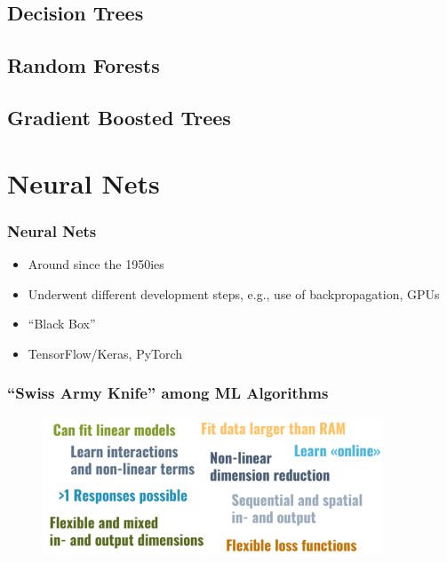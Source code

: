 \documentclass[
    utf8,
    aspectratio=169
]{beamer}  %
\begin{document}
\subsection{Decision Trees}

\subsection{Random Forests}

\subsection{Gradient Boosted Trees}

\section{Neural Nets}

\begin{frame}
	\frametitle{Neural Nets}
	\begin{itemize}
		\item Around since the 1950ies
		\item Underwent different development steps, e.g., use of backpropagation, GPUs
		\item ``Black Box''
		\item TensorFlow/Keras, PyTorch
	\end{itemize}
\end{frame}

\begin{frame}
\frametitle{``Swiss Army Knife'' among ML Algorithms}
\begin{figure}
	\includegraphics[width=0.9\textwidth]{pics/nn_knife.png}
\end{figure}
\end{frame}
\end{document}
